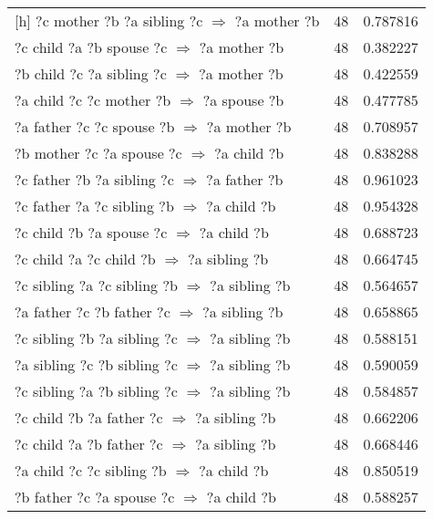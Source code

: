 \begin{longtable}{lrr}[h]
     ?c  mother  ?b  ?a  sibling  ?c   $\Rightarrow$ ?a  mother  ?b &           48 &        0.787816 \\
       ?c  child  ?a  ?b  spouse  ?c   $\Rightarrow$ ?a  mother  ?b &           48 &        0.382227 \\
      ?b  child  ?c  ?a  sibling  ?c   $\Rightarrow$ ?a  mother  ?b &           48 &        0.422559 \\
       ?a  child  ?c  ?c  mother  ?b   $\Rightarrow$ ?a  spouse  ?b &           48 &        0.477785 \\
      ?a  father  ?c  ?c  spouse  ?b   $\Rightarrow$ ?a  mother  ?b &           48 &        0.708957 \\
       ?b  mother  ?c  ?a  spouse  ?c   $\Rightarrow$ ?a  child  ?b &           48 &        0.838288 \\
     ?c  father  ?b  ?a  sibling  ?c   $\Rightarrow$ ?a  father  ?b &           48 &        0.961023 \\
      ?c  father  ?a  ?c  sibling  ?b   $\Rightarrow$ ?a  child  ?b &           48 &        0.954328 \\
        ?c  child  ?b  ?a  spouse  ?c   $\Rightarrow$ ?a  child  ?b &           48 &        0.688723 \\
       ?c  child  ?a  ?c  child  ?b   $\Rightarrow$ ?a  sibling  ?b &           48 &        0.664745 \\
   ?c  sibling  ?a  ?c  sibling  ?b   $\Rightarrow$ ?a  sibling  ?b &           48 &        0.564657 \\
     ?a  father  ?c  ?b  father  ?c   $\Rightarrow$ ?a  sibling  ?b &           48 &        0.658865 \\
   ?c  sibling  ?b  ?a  sibling  ?c   $\Rightarrow$ ?a  sibling  ?b &           48 &        0.588151 \\
   ?a  sibling  ?c  ?b  sibling  ?c   $\Rightarrow$ ?a  sibling  ?b &           48 &        0.590059 \\
   ?c  sibling  ?a  ?b  sibling  ?c   $\Rightarrow$ ?a  sibling  ?b &           48 &        0.584857 \\
      ?c  child  ?b  ?a  father  ?c   $\Rightarrow$ ?a  sibling  ?b &           48 &        0.662206 \\
      ?c  child  ?a  ?b  father  ?c   $\Rightarrow$ ?a  sibling  ?b &           48 &        0.668446 \\
       ?a  child  ?c  ?c  sibling  ?b   $\Rightarrow$ ?a  child  ?b &           48 &        0.850519 \\
       ?b  father  ?c  ?a  spouse  ?c   $\Rightarrow$ ?a  child  ?b &           48 &        0.588257 \\

\end{longtable}

